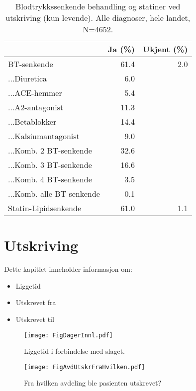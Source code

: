 \documentclass [norsk,a4paper,twoside]{article}\usepackage[]{graphicx}\usepackage[]{color}
\begin{document}
\begin{table}[ht]
\centering
\begin{tabular}{lrr}
  \hline
 & Ja (\%) & Ukjent (\%) \\ 
  \hline
BT-senkende & 61.4 & 2.0 \\ 
  ...Diuretica & 6.0 &  \\ 
  ...ACE-hemmer & 5.4 &  \\ 
  ...A2-antagonist & 11.3 &  \\ 
  ...Betablokker & 14.4 &  \\ 
  ...Kalsiumantagonist & 9.0 &  \\ 
  ...Komb. 2 BT-senkende & 32.6 &  \\ 
  ...Komb. 3 BT-senkende & 16.6 &  \\ 
  ...Komb. 4 BT-senkende & 3.5 &  \\ 
  ...Komb. alle BT-senkende & 0.1 &  \\ 
  Statin-Lipidsenkende & 61.0 & 1.1 \\ 
   \hline
\end{tabular}
\caption{Blodtrykkssenkende behandling og statiner ved utskriving (kun levende). 
		Alle diagnoser, hele landet, N=4652.} 
\label{tab:MedBehBTSUt2}
\end{table}


\clearpage
\section{Utskriving}

Dette kapitlet inneholder informasjon om:
\begin{itemize}
	\item Liggetid
	\item Utskrevet fra
	\item Utskrevet til
\end{itemize}




\begin{figure}[ht]
\centering \texttt{[image: FigDagerInnl.pdf]}
\caption{\label{fig:AntDagerInnl} Liggetid i forbindelse med slaget.}
\end{figure}

\begin{figure}[ht]
\centering \texttt{[image: FigAvdUtskrFraHvilken.pdf]}
\caption{\label{fig:AvdUtskrFraHvilken} Fra hvilken avdeling ble pasienten utskrevet?}
\end{figure}
\end{document}
